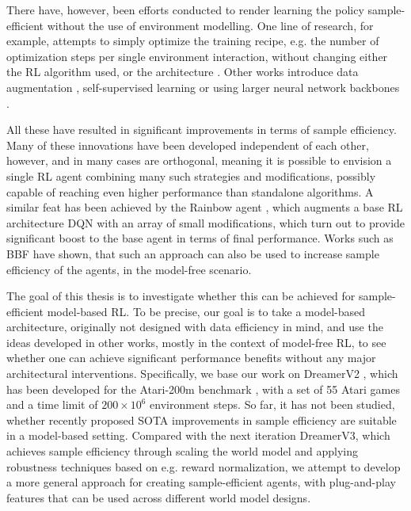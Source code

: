 \documentclass[en]{pracamgr}
\begin{document}
There have, however, been efforts conducted to render learning the policy sample-efficient without the use of environment modelling. One line of research, for example, attempts to simply optimize the training recipe, e.g. the number of optimization steps per single environment interaction, without changing either the RL algorithm used, or the architecture \autocite{doroSampleEfficientReinforcementLearning2022,schmidtFastDataEfficientTraining2021}. Other works introduce data augmentation \autocite{kostrikovImageAugmentationAll2021,yaratsMasteringVisualContinuous2021}, self-supervised learning \autocite{schwarzerDataEfficientReinforcementLearning2021} or using larger neural network backbones \autocite{hafnerMasteringDiverseDomains2024,schwarzerBiggerBetterFaster2023}.

All these have resulted in significant improvements in terms of sample efficiency. Many of these innovations have been developed independent of each other, however, and in many cases are orthogonal, meaning it is possible to envision a single RL agent combining many such strategies and modifications, possibly capable of reaching even higher performance than standalone algorithms. A similar feat has been achieved by the Rainbow agent \autocite{hesselRainbowCombiningImprovements2017}, which augments a base RL architecture DQN \autocite{mnihHumanlevelControlDeep2015} with an array of small modifications, which turn out to provide significant boost to the base agent in terms of final performance. Works such as BBF \autocite{schwarzerBiggerBetterFaster2023} have shown, that such an approach can also be used to increase sample efficiency of the agents, in the model-free scenario.

The goal of this thesis is to investigate whether this can be achieved for sample-efficient model-based RL. To be precise, our goal is to take a model-based architecture, originally not designed with data efficiency in mind, and use the ideas developed in other works, mostly in the context of model-free RL, to see whether one can achieve significant performance benefits without any major architectural interventions. Specifically, we base our work on DreamerV2 \autocite{hafnerMasteringAtariDiscrete2022}, which has been developed for the Atari-200m benchmark \cite{bellemareArcadeLearningEnvironment2013}, with a set of 55 Atari games and a time limit of $200 \times 10^6$ environment steps. So far, it has not been studied, whether recently proposed SOTA improvements in sample efficiency are suitable in a model-based setting. Compared with the next iteration DreamerV3, which achieves sample efficiency through scaling the world model and applying robustness techniques based on e.g. reward normalization, we attempt to develop a more general approach for creating sample-efficient agents, with plug-and-play features that can be used across different world model designs.
\end{document}
